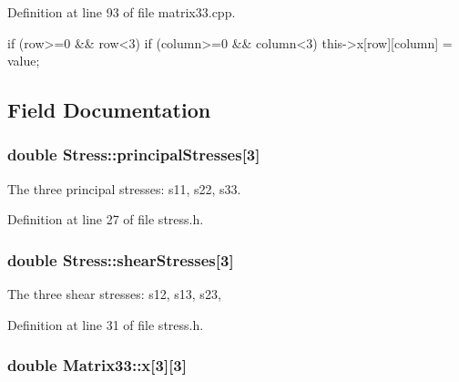 \-Definition at line 93 of file matrix33.\-cpp.


\begin{DoxyCode}
{
  if (row>=0 && row<3)
    {
      if (column>=0 && column<3)
        {
          this->x[row][column] = value;
        }
    }
}
\end{DoxyCode}


\subsection{\-Field \-Documentation}
\hypertarget{classStress_aea8c3e40aa59a89d7ba79d2c916050a6}{
\subsubsection[{principal\-Stresses}]{\setlength{\rightskip}{0pt plus 5cm}double {\bf \-Stress\-::principal\-Stresses}\mbox{[}3\mbox{]}}}\label{d1/d1c/classStress_aea8c3e40aa59a89d7ba79d2c916050a6}
\-The three principal stresses\-: s11, s22, s33. 

\-Definition at line 27 of file stress.\-h.

\hypertarget{classStress_a77e8705e56c2fb56826a638edf3f78bf}{
\subsubsection[{shear\-Stresses}]{\setlength{\rightskip}{0pt plus 5cm}double {\bf \-Stress\-::shear\-Stresses}\mbox{[}3\mbox{]}}}\label{d1/d1c/classStress_a77e8705e56c2fb56826a638edf3f78bf}
\-The three shear stresses\-: s12, s13, s23, 

\-Definition at line 31 of file stress.\-h.

\hypertarget{classMatrix33_af7f01fa466616eb7c8eda2e4d9f85cdd}{
\subsubsection[{x}]{\setlength{\rightskip}{0pt plus 5cm}double {\bf \-Matrix33\-::x}\mbox{[}3\mbox{]}\mbox{[}3\mbox{]}}}\label{de/d82/classMatrix33_af7f01fa466616eb7c8eda2e4d9f85cdd}


